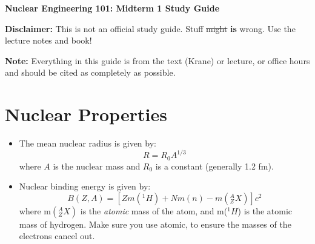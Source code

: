 \documentclass[letter]{article}
\begin{document}
\textbf{\Large{Nuclear Engineering 101: Midterm 1 Study Guide}} \\
\vspace{12pt}

\textbf{Disclaimer:} This is not an official study guide. Stuff \sout{might}
\textbf{is} wrong. Use the lecture notes and book!
\vspace{10pt}

\textbf{Note:} Everything in this guide is from the text (Krane) or
lecture, or office hours and should be cited as completely as
possible.

\tableofcontents

\section{Nuclear Properties}
\begin{itemize}
\item The mean nuclear radius is given by:
  \begin{equation*}
    R = R_0A^{1/3}
  \end{equation*}
where $A$ is the nuclear mass and $R_0$ is a constant (generally 1.2
fm).~\cite[pp. 48]{krane}
\item Nuclear binding energy is given by:
  \begin{equation*}
    B(Z,A) = [Zm(^1H) + Nm(n) - m(^A_ZX)]c^2
  \end{equation*}
where m$(^A_ZX)$ is the \textit{atomic} mass of the atom, and m($^1H$)
is the atomic mass of hydrogen. Make sure you use atomic, to ensure
the masses of the electrons cancel out.~\cite[Lec 2]{lecture}
\end{itemize}
\end{document}
